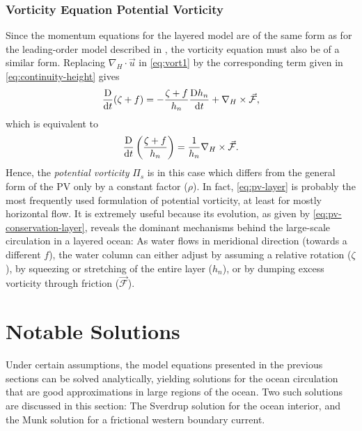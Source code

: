 \subsubsection{Vorticity Equation \oldand Potential Vorticity}
Since the momentum equations for the layered model are of the same form as for the leading-order model described in , the vorticity equation must also be of a similar form. Replacing \(\nabla_H \cdot \vec{u}\) in \eqref{eq:vort1} by the corresponding term given in \eqref{eq:continuity-height} gives
%
\begin{equation}
\Ddx(\zeta + f) = - \frac{\zeta + f}{h_n}\Ddx[h_n] + \nabla_H \times \vec{\mathcal{F}}, \label{eq:vorticity-layer}
\end{equation}
%
which is equivalent to
%
\begin{equation}
\Ddx\left( \frac{\zeta + f}{h_n} \right) = \frac{1}{h_n} \nabla_H \times \vec{\mathcal{F}}. \label{eq:pv-conservation-layer}
\end{equation}
%
Hence, the \emph{potential vorticity} \(\Pi_s\) is in this case
%
%
which differs from the general form of the \ac{PV} only by a constant factor (\(\rho\)). In fact, \eqref{eq:pv-layer} is probably the most frequently used formulation of potential vorticity, at least for mostly horizontal flow. It is extremely useful because its evolution, as given by \eqref{eq:pv-conservation-layer}, reveals the dominant mechanisms behind the large-scale circulation in a layered ocean: As water flows in meridional direction (\ie towards a different \(f\)), the water column can either adjust by assuming a relative rotation (\(\zeta\)), by squeezing or stretching of the entire layer (\(h_n\)), or by dumping excess vorticity through friction (\(\vec{\mathcal{F}}\)).


\section{Notable Solutions}
\label{sec:physics-solutions}
Under certain assumptions, the model equations presented in the previous sections can be solved analytically, yielding solutions for the ocean circulation that are good approximations in large regions of the ocean. Two such solutions are discussed in this section: The Sverdrup solution for the ocean interior, and the Munk solution for a frictional western boundary current.


